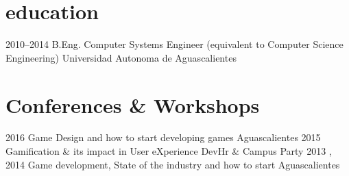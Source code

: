 \documentclass[]{cv-style}          %
\begin{document}
%
%
%





\section{education}

\begin{entrylist}
\entry
{2010--2014}
{B.Eng. {\normalfont Computer Systems Engineer (equivalent to Computer Science Engineering) }}
{Universidad Autonoma de Aguascalientes}
{\vspace{-0.3cm}}

\end{entrylist}





\section{Conferences \& Workshops}

\begin{entrylist}
\entry
{2016}
{{\normalfont Game Design and how to start developing games }}
{Aguascalientes}
{\vspace{-0.3cm}}
\entry
{2015}
{{\normalfont Gamification \& its impact in User eXperience }}
{DevHr \& Campus Party }
{\vspace{-0.3cm}}
\entry
{2013 , 2014}
{{\normalfont Game development, State of the industry and how to start }}
{Aguascalientes}
{\vspace{-0.3cm}}

\end{entrylist}
\end{document}
